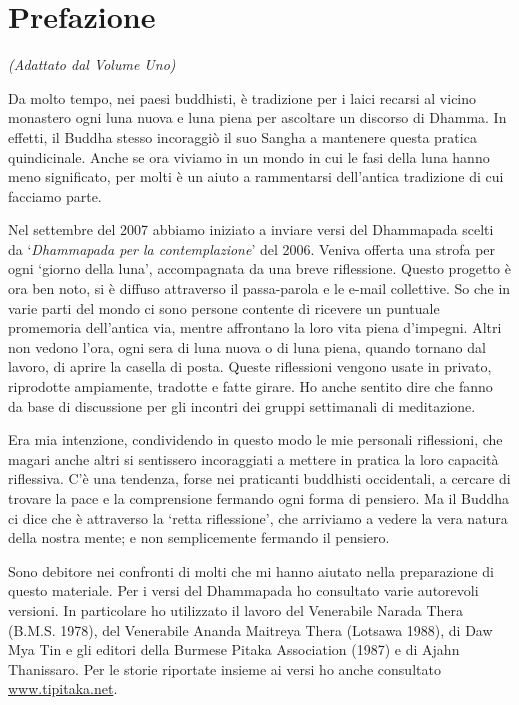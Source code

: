 \chapter{Prefazione}

{\centering
\emph{(Adattato dal Volume Uno)}%
\par}

\bigskip

\noindent
Da molto tempo, nei paesi buddhisti, è tradizione per i laici recarsi al
vicino monastero ogni luna nuova e luna piena per ascoltare un discorso
di Dhamma. In effetti, il Buddha stesso incoraggiò il suo Sangha a
mantenere questa pratica quindicinale. Anche se ora viviamo in un mondo
in cui le fasi della luna hanno meno significato, per molti è un aiuto a
rammentarsi dell'antica tradizione di cui facciamo parte.

Nel settembre del 2007 abbiamo iniziato a inviare versi del Dhammapada
scelti da `\emph{Dhammapada per la contemplazione}' del 2006. Veniva
offerta una strofa per ogni `giorno della luna', accompagnata da una
breve riflessione. Questo progetto è ora ben noto, si è diffuso
attraverso il passa-parola e le e-mail collettive. So che in varie parti
del mondo ci sono persone contente di ricevere un puntuale promemoria
dell'antica via, mentre affrontano la loro vita piena d'impegni. Altri
non vedono l'ora, ogni sera di luna nuova o di luna piena, quando
tornano dal lavoro, di aprire la casella di posta. Queste riflessioni
vengono usate in privato, riprodotte ampiamente, tradotte e fatte
girare. Ho anche sentito dire che fanno da base di discussione per gli
incontri dei gruppi settimanali di meditazione.

Era mia intenzione, condividendo in questo modo le mie personali
riflessioni, che magari anche altri si sentissero incoraggiati a mettere
in pratica la loro capacità riflessiva. C'è una tendenza, forse nei
praticanti buddhisti occidentali, a cercare di trovare la pace e la
comprensione fermando ogni forma di pensiero. Ma il Buddha ci dice che è
attraverso la `retta riflessione', che arriviamo a vedere la vera natura
della nostra mente; e non semplicemente fermando il pensiero.

Sono debitore nei confronti di molti che mi hanno aiutato nella
preparazione di questo materiale. Per i versi del Dhammapada ho
consultato varie autorevoli versioni. In particolare ho utilizzato il
lavoro del Venerabile Narada Thera (B.M.S. 1978), del Venerabile Ananda
Maitreya Thera (Lotsawa 1988), di Daw Mya Tin e gli editori della
Burmese Pitaka Association (1987) e di Ajahn Thanissaro. Per le storie
riportate insieme ai versi ho anche consultato
\href{http://www.tipitaka.net/}{www.tipitaka.net}.

